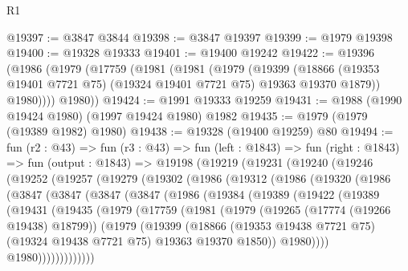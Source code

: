 \begin{lexlean}{R1}
\begin{coremodule}
@19397 := @3847 @3844
@19398 := @3847 @19397
@19399 := @1979 @19398
@19400 := @19328 @19333
@19401 := @19400 @19242
@19422 := @19396
    (@1986
      (@1979
        (@17759
          (@1981
            (@1981
              (@1979
                (@19399
                  (@18866 (@19353 @19401 @7721 @75) (@19324 @19401 @7721 @75) @19363 @19370 @1879))
                @1980))))
        @1980))
@19424 := @1991 @19333 @19259
@19431 := @1988 (@1990 @19424 @1980) (@1997 @19424 @1980) @1982
@19435 := @1979 (@1979 (@19389 @1982) @1980)
@19438 := @19328 (@19400 @19259) @80
@19494 := fun (r2 : @43) =>
  fun (r3 : @43) =>
  fun (left : @1843) =>
  fun (right : @1843) =>
  fun (output : @1843) =>
  @19198
    (@19219
      (@19231
        (@19240
          (@19246
            (@19252
              (@19257
                (@19279
                  (@19302
                    (@1986
                      (@19312
                        (@1986
                          (@19320
                            (@1986
                              (@3847
                                (@3847
                                  (@3847
                                    (@3847
                                      (@1986
                                        (@19384
                                          (@19389
                                            (@19422
                                              (@19389
                                                (@19431
                                                  (@19435
                                                    (@1979
                                                      (@17759
                                                        (@1981
                                                          (@1979
                                                            (@19265 (@17774 (@19266 @19438) @18799))
                                                            (@1979
                                                              (@19399
                                                                (@18866
                                                                  (@19353 @19438 @7721 @75)
                                                                  (@19324 @19438 @7721 @75)
                                                                  @19363
                                                                  @19370
                                                                  @1850))
                                                              @1980))))
                                                      @1980)))))))))))))

\end{coremodule}
\end{lexlean}
